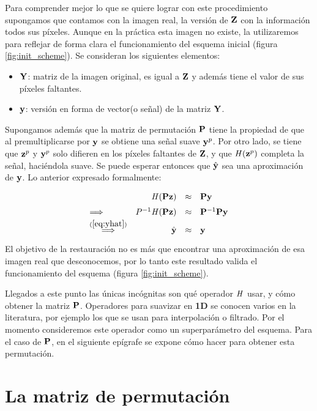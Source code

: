 Para comprender mejor lo que se quiere lograr con este procedimiento supongamos que contamos con la imagen real, la versi\'on de $\Z$ con la informaci\'on todos sus p\'ixeles. Aunque en la pr\'actica esta imagen no existe, la utilizaremos para reflejar de forma clara el funcionamiento del esquema inicial (figura \ref{fig:init_scheme}). Se consideran los siguientes elementos:
\begin{itemize}
	\item $\Y$: matriz de la imagen original, es igual a $\Z$ y adem\'as tiene el valor de sus p\'ixeles faltantes. 
	\item $\y$: versión en forma de vector(o señal) de la matriz $\Y$.
\end{itemize}
Supongamos adem\'as que la matriz de permutaci\'on $\P$ tiene la propiedad de que al premultiplicarse por $\y$ se obtiene una señal suave $\y^p$. Por otro lado, se tiene que $\z^p$ y $\y^p$ solo difieren en los p\'ixeles faltantes de $\Z$, y que $\H(\z^p)$ completa la señal, haciéndola suave. Se puede esperar entonces que $\yhat$ sea una aproximaci\'on de $\y$. Lo anterior expresado formalmente:
\begin{equation}
	\def\arraystretch{1.5}
	\begin{array}{lrcl}
		                                           &     \H (\P\z ) &\approx& \P\y        \\ 
		\Longrightarrow                            & P^{-1}\H(\P\z) &\approx& \P^{-1}\P\y \\
		\overset{(\ref{eq:yhat})}{\Longrightarrow} &          \yhat &\approx& \y          \\
	\end{array}
	\label{eq:permutation_smoothness}
\end{equation}
El objetivo de la restauraci\'on no es m\'as que encontrar una aproximaci\'on de esa imagen real que desconocemos, por lo tanto este resultado valida el funcionamiento del esquema (figura \ref{fig:init_scheme}).

Llegados a este punto las únicas incógnitas son qu\'e operador $\H$ usar, y c\'omo obtener la matriz $\P$. Operadores para suavizar en \textbf{1D} se conocen varios en la literatura, por ejemplo los que se usan para interpolaci\'on o filtrado. Por el momento consideremos este operador como un superpar\'ametro del esquema. Para el caso de $\P$, en el siguiente ep\'igrafe se expone c\'omo hacer para obtener esta permutaci\'on.

\section{La matriz de permutaci\'on}


